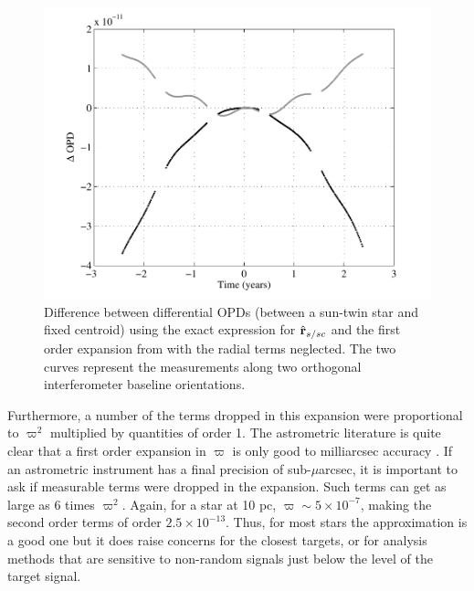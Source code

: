 \begin{figure}[ht]
\centering
\includegraphics[width=5.5in]{./figures/first_order_expansion_norv}
 \caption[First order expansion of astrometric observation without radial velocity terms]{Difference between differential OPDs (between a sun-twin star and fixed centroid) using the exact expression for $\hat{\mathbf{r}}_{s/sc}$ and the first order expansion from  with the radial terms neglected. The two curves represent the measurements along two orthogonal interferometer baseline orientations.\label{fig:first_order_expansion_norv}}
 \end{figure}
 
Furthermore, a number of the terms dropped in this expansion were proportional to $\varpi^2$ multiplied by quantities of order 1.  The astrometric literature is quite clear that a first order expansion in $\varpi$ is only good to milliarcsec accuracy \citep{green1985spherical}.  If an astrometric instrument has a final precision of sub-$\mu$arcsec, it is important to ask if measurable terms were dropped in the expansion.  Such terms can get as large as 6 times $\varpi^2$.  Again, for a star at 10 pc, $\varpi \sim 5 \times 10^{-7}$, making the second order terms of order $2.5 \times 10^{-13}$.   Thus, for most stars the approximation is a good one but it does raise concerns for the closest targets, or for analysis methods that are sensitive to non-random signals just below the level of the target signal.  


